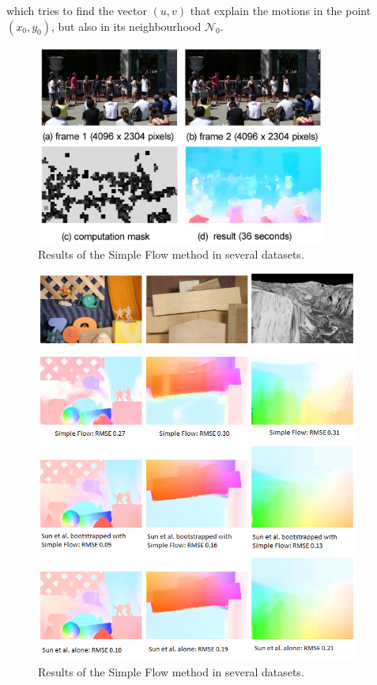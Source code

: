 \noindent  which tries 
to find the vector $(u,v)$ that explain the motions in the point $(x_0,y_0)$, but also in its 
neighbourhood $\mathcal{N}_{0}$.

   \begin{figure}[tbhp]
      \centering
      \includegraphics[width=0.85\textwidth]{../images/simpleflow.png}
      \caption{  Results of the Simple Flow method in several datasets. }
      \label{simple_of_m}
   \end{figure}

   \begin{figure}[tbhp]
      \centering
      \includegraphics[width=0.95\textwidth]{../images/simpleoptflow.png}
      \caption{  Results of the Simple Flow method in several datasets. }
      \label{simple_of}
   \end{figure}

